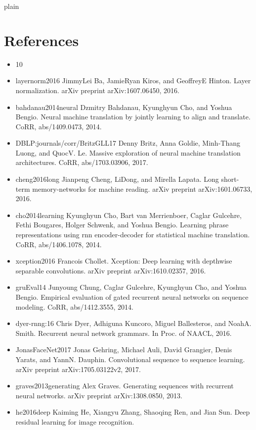\documentclass[11pt,a4paper]{article}
\begin{document}
plain

\section{References}

\begin{itemize}
\item 10
\item layernorm2016
JimmyLei Ba, JamieRyan Kiros, and GeoffreyE Hinton.
Layer normalization.
arXiv preprint arXiv:1607.06450, 2016.
\item bahdanau2014neural
Dzmitry Bahdanau, Kyunghyun Cho, and Yoshua Bengio.
Neural machine translation by jointly learning to align and
  translate.
CoRR, abs/1409.0473, 2014.
\item DBLP:journals/corr/BritzGLL17
Denny Britz, Anna Goldie, Minh-Thang Luong, and QuocV. Le.
Massive exploration of neural machine translation architectures.
CoRR, abs/1703.03906, 2017.
\item cheng2016long
Jianpeng Cheng, LiDong, and Mirella Lapata.
Long short-term memory-networks for machine reading.
arXiv preprint arXiv:1601.06733, 2016.
\item cho2014learning
Kyunghyun Cho, Bart van Merrienboer, Caglar Gulcehre, Fethi Bougares, Holger
  Schwenk, and Yoshua Bengio.
Learning phrase representations using rnn encoder-decoder for
  statistical machine translation.
CoRR, abs/1406.1078, 2014.
\item xception2016
Francois Chollet.
Xception: Deep learning with depthwise separable convolutions.
arXiv preprint arXiv:1610.02357, 2016.
\item gruEval14
Junyoung Chung, Caglar Gulcehre, Kyunghyun Cho, and Yoshua
  Bengio.
Empirical evaluation of gated recurrent neural networks on sequence
  modeling.
CoRR, abs/1412.3555, 2014.
\item dyer-rnng:16
Chris Dyer, Adhiguna Kuncoro, Miguel Ballesteros, and NoahA. Smith.
Recurrent neural network grammars.
In Proc. of NAACL, 2016.
\item JonasFaceNet2017
Jonas Gehring, Michael Auli, David Grangier, Denis Yarats, and YannN. Dauphin.
Convolutional sequence to sequence learning.
arXiv preprint arXiv:1705.03122v2, 2017.
\item graves2013generating
Alex Graves.
Generating sequences with recurrent neural networks.
arXiv preprint arXiv:1308.0850, 2013.
\item he2016deep
Kaiming He, Xiangyu Zhang, Shaoqing Ren, and Jian Sun.
Deep residual learning for image recognition.

\end{itemize}
\end{document}
